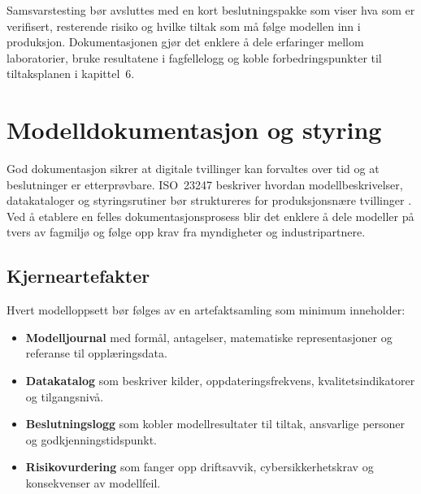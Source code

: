 Samsvarstesting bør avsluttes med en kort beslutningspakke som viser hva som er verifisert, resterende risiko og hvilke tiltak som
må følge modellen inn i produksjon. Dokumentasjonen gjør det enklere å dele erfaringer mellom laboratorier, bruke resultatene i
fagfellelogg og koble forbedringspunkter til tiltaksplanen i kapittel~6.

\section{Modelldokumentasjon og styring}
God dokumentasjon sikrer at digitale tvillinger kan forvaltes over tid og at beslutninger er etterprøvbare. ISO~23247 beskriver hvordan modellbeskrivelser, datakataloger og styringsrutiner bør struktureres for produksjonsnære tvillinger \citep{iso23247-2021}. Ved å etablere en felles dokumentasjonsprosess blir det enklere å dele modeller på tvers av fagmiljø og følge opp krav fra myndigheter og industripartnere.

\subsection{Kjerneartefakter}
Hvert modelloppsett bør følges av en artefaktsamling som minimum inneholder:
\begin{itemize}
    \item \textbf{Modelljournal} med formål, antagelser, matematiske representasjoner og referanse til opplæringsdata.
    \item \textbf{Datakatalog} som beskriver kilder, oppdateringsfrekvens, kvalitetsindikatorer og tilgangsnivå.
    \item \textbf{Beslutningslogg} som kobler modellresultater til tiltak, ansvarlige personer og godkjenningstidspunkt.
    \item \textbf{Risikovurdering} som fanger opp driftsavvik, cybersikkerhetskrav og konsekvenser av modellfeil.
\end{itemize}

